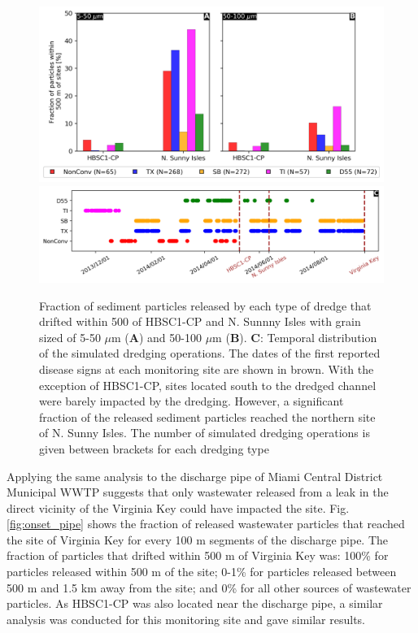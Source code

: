 \begin{figure}
	\centering
	\includegraphics[width=\textwidth]{chapters/onset/figures/aggregated_new.png}
	\includegraphics[width=\textwidth]{chapters/onset/figures/timeline.png}
	\caption{Fraction of sediment particles released by each type of dredge that drifted within 500 of HBSC1-CP and N. Sunnny Isles with grain sized of 5-50 $\mu$m (\textbf{A}) and 50-100 $\mu$m (\textbf{B}). \textbf{C}: Temporal distribution of the simulated dredging operations. The dates of the first reported disease signs at each monitoring site are shown in brown. With the exception of HBSC1-CP, sites located south to the dredged channel were barely impacted by the dredging. However, a significant fraction of the released sediment particles reached the northern site of N. Sunny Isles. The number of simulated dredging operations is given between brackets for each dredging type}
	\label{fig:onset_bar}
\end{figure}

Applying the same analysis to the discharge pipe of Miami Central District Municipal WWTP suggests that only wastewater released from a leak in the direct vicinity of the Virginia Key could have impacted the site. Fig. \ref{fig:onset_pipe} shows the fraction of released wastewater particles that reached the site of Virginia Key for every 100 m segments of the discharge pipe. The fraction of particles that drifted within 500 m of Virginia Key was: 100\% for particles released within 500 m of the site; 0-1\% for particles released between 500 m and 1.5 km away from the site; and 0\% for all other sources of wastewater particles. As HBSC1-CP was also located near the discharge pipe, a similar analysis was conducted for this monitoring site and gave similar results.

